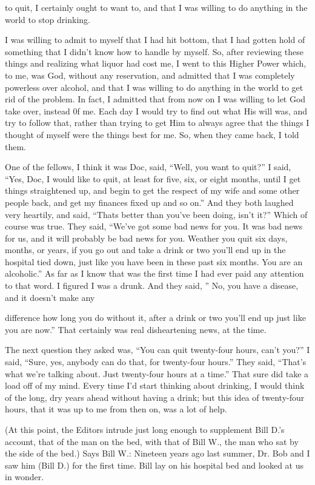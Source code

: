 \begin{biblechapter}
to quit, I certainly ought to want to, and that I was willing to do anything in the world to stop drinking.

I was willing to admit to myself that I had hit bottom, that I had gotten hold of something that I didn’t know how to handle by myself. So, after reviewing these things and realizing what liquor had cost me, I went to this Higher Power which, to me, was God, without any reservation, and admitted that I was completely powerless over alcohol, and that I was willing to do anything in the world to get rid of the problem. In fact, I admitted that from now on I was willing to let God take over, instead 0f me. Each day I would try to find out what His will was, and try to follow that, rather than trying to get Him to always agree that the things I thought of myself were the things best for me. So, when they came back, I told them.

One of the fellows, I think it was Doc, said, “Well, you want to quit?” I said, “Yes, Doc, I would like to quit, at least for five, six, or eight months, until I get things straightened up, and begin to get the respect of my wife and some other people back, and get my finances fixed up and so on.” And they both laughed very heartily, and said, “Thats better than you’ve been doing, isn’t it?” Which of course was true. They said, “We’ve got some bad news for you. It was bad news for us, and it will probably be bad news for you. Weather you quit six days, months, or years, if you go out and take a drink or two you’ll end up in the hospital tied down, just like you have been in these past six months. You are an alcoholic.” As far as I know that was the first time I had ever paid any attention to that word. I figured I was a drunk. And they said, ” No, you have a disease, and it doesn’t make any

difference how long you do without it, after a drink or two you’ll end up just like you are now.” That certainly was real disheartening news, at the time.

The next question they asked was, “You can quit twenty-four hours, can’t you?” I said, “Sure, yes, anybody can do that, for twenty-four hours.” They said, “That’s what we’re talking about. Just twenty-four hours at a time.” That sure did take a load off of my mind. Every time I’d start thinking about drinking, I would think of the long, dry years ahead without having a drink; but this idea of twenty-four hours, that it was up to me from then on, was a lot of help.

(At this point, the Editors intrude just long enough to supplement Bill D.’s account, that of the man on the bed, with that of Bill W., the man who sat by the side of the bed.) Says Bill W.:
Nineteen years ago last summer, Dr. Bob and I saw him (Bill D.) for the first time. Bill lay on his hospital bed and looked at us in wonder.


\end{biblechapter}
